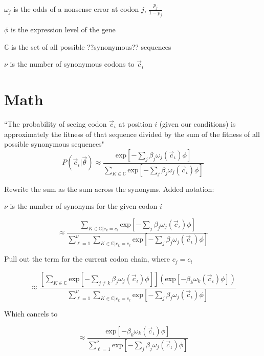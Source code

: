 $\omega_j$ is the odds of a nonsense error at codon $j$, $\frac{p_j}{1-p_j}$ 

$\phi$ is the expression level of the gene

$\mathbb{C}$ is the set of all possible ??synonymous?? sequences

$\nu$ is the number of synonymous codons to $\vec{c}_i$

\section{Math}

``The probability of seeing codon $\vec{c}_i$ at position $i$ (given our conditions) is approximately the fitness of that sequence divided by the sum of the fitness of all possible synonymous sequences"
\[
P(\vec{c}_\iota | \vec{\theta}) \approx
\frac{
\mbox{exp}\left[-\sum_{j} \beta_j \omega_j (\vec{c}_\iota) \phi \right]
}{
\sum _{K \in \mathbb{C}}
\mbox{exp}\left[-\sum_j \beta_j \omega_j (\vec{c}_\iota) \phi \right]
}
\]


Rewrite the sum as the sum across the synonyms.
Added notation: 

$\nu$ is the number of synonyms for the given codon $i$

\[
\approx
\frac{
\sum _{K \in \mathbb{C} | c_k = c_\iota}
\mbox{exp}\left[-\sum_{j} \beta_j \omega_j (\vec{c}_\iota) \phi \right]
}{
\sum_{\ell=1}^\nu
\sum _{K \in \mathbb{C} | c_k = c_\ell}
\mbox{exp}\left[-\sum_j \beta_j \omega_j (\vec{c}_\iota) \phi \right]
}
\]

Pull out the term for the current codon chain, where $c_j=c_i$

\[
\approx
\frac{
\left[
\sum _{K \in \mathbb{C}}
\mbox{exp}\left[-\sum_{j\neq k} \beta_j \omega_j (\vec{c}_\iota) \phi \right]
\right]
\left(\mbox{exp}\left[-\beta_k \omega_k (\vec{c}_\iota) \phi \right]\right)
}{
\sum_{\ell=1}^\nu
\sum _{K \in \mathbb{C} | c_k = c_\ell}
\mbox{exp}\left[-\sum_j \beta_j \omega_j (\vec{c}_\iota) \phi \right]
}
\]


Which cancels to


\[
\approx
\frac{
\mbox{exp}\left[-\beta_k \omega_k (\vec{c}_\iota) \phi \right]
}{
\sum_{\ell=1}^\nu
\mbox{exp}\left[-\sum_j \beta_j \omega_j (\vec{c}_\iota) \phi \right]
}
\]


